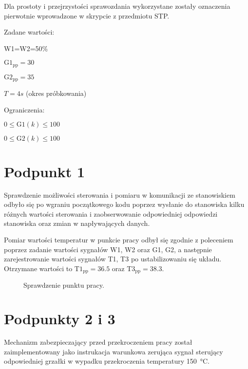 \bigskip

\bigskip

Dla prostoty i przejrzystości sprawozdania wykorzystane zostały oznaczenia pierwotnie wprowadzone w skrypcie z przedmiotu STP.

\bigskip

Zadane wartości:

\smallskip

W1=W2=50\%

\smallskip

$\mathrm{G1_{pp}}=30$

\smallskip

$\mathrm{G2_{pp}}=35$

\smallskip

$T=4s$ (okres próbkowania)

\bigskip

Ograniczenia:

\smallskip

$0 \le \mathrm{G1}(k) \le 100$

$0 \le \mathrm{G2}(k) \le 100$

\chapter{Podpunkt 1}
Sprawdzenie możliwości sterowania i pomiaru w komunikacji ze stanowiskiem odbyło się po wgraniu początkowego kodu poprzez wysłanie do stanowiska kilku różnych wartości sterowania i zaobserwowanie odpowiedniej odpowiedzi stanowiska oraz zmian w napływających danych.

Pomiar wartości temperatur w punkcie pracy odbył się zgodnie z poleceniem poprzez zadanie wartości sygnałów W1, W2 oraz G1, G2, a następnie zarejestrowanie wartości sygnałów T1, T3 po ustabilizowaniu się układu. Otrzymane wartości to $\mathrm{T1_{pp}}=\num{36,5}$ oraz $\mathrm{T3_{pp}}=\num{38,3}$.

\begin{figure}[ht]
\centering

\caption{Sprawdzenie punktu pracy.}
\label{Z1T1}
\end{figure}

\chapter{Podpunkty 2 i 3}
Mechanizm zabezpieczający przed przekroczeniem pracy został zaimplementowany jako instrukacja warunkowa zerująca sygnał sterujący odpowiedniej grzałki w wypadku przekroczenia temperatury \SI{150}{\celsius}.

